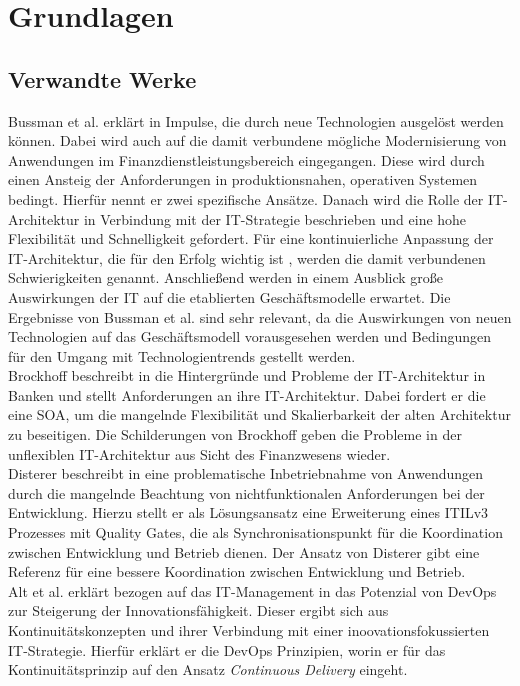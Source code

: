 \chapter{Grundlagen}

\section{Verwandte Werke}
Bussman et al. erklärt in \cite{Bussmann2006} Impulse, die durch neue Technologien ausgelöst werden können. Dabei wird auch auf die damit verbundene mögliche Modernisierung von Anwendungen im Finanzdienstleistungsbereich eingegangen. Diese wird durch einen Ansteig der Anforderungen in produktionsnahen, operativen Systemen \cite{Bussmann2006, Brockhoff2006} bedingt. Hierfür nennt er zwei spezifische Ansätze. Danach wird die Rolle der IT-Architektur in Verbindung mit der IT-Strategie beschrieben und eine hohe Flexibilität und Schnelligkeit gefordert. Für eine kontinuierliche Anpassung der IT-Architektur, die für den Erfolg wichtig ist \cite{Bussmann2006}, werden die damit verbundenen Schwierigkeiten genannt. Anschließend werden in einem Ausblick große Auswirkungen der IT auf die etablierten Geschäftsmodelle erwartet. Die Ergebnisse von Bussman et al. sind sehr relevant, da die Auswirkungen von neuen Technologien auf das Geschäftsmodell vorausgesehen werden und Bedingungen für den Umgang mit Technologientrends gestellt werden.
\medskip
\\
Brockhoff beschreibt in \cite{Brockhoff2006} die Hintergründe und Probleme der IT-Architektur in Banken und stellt Anforderungen an ihre IT-Architektur. Dabei fordert er die eine \ac{SOA}, um die mangelnde Flexibilität und Skalierbarkeit der alten Architektur zu beseitigen. Die Schilderungen von Brockhoff geben die Probleme in der unflexiblen IT-Architektur aus Sicht des Finanzwesens wieder.
\medskip
\\
Disterer beschreibt in \cite{mci/Disterer2011} eine problematische Inbetriebnahme von Anwendungen durch die mangelnde Beachtung von nichtfunktionalen Anforderungen bei der Entwicklung. Hierzu stellt er als Lösungsansatz eine Erweiterung eines ITILv3 Prozesses mit Quality Gates, die als Synchronisationspunkt für die Koordination zwischen Entwicklung und Betrieb dienen. Der Ansatz von Disterer gibt eine Referenz für eine bessere Koordination zwischen Entwicklung und Betrieb.
\medskip
\\
Alt et al. erklärt bezogen auf das IT-Management in \cite{Alt2017} das Potenzial von DevOps zur Steigerung der Innovationsfähigkeit. Dieser ergibt sich aus Kontinuitätskonzepten und ihrer Verbindung mit einer inoovationsfokussierten IT-Strategie. Hierfür erklärt er die DevOps Prinzipien, worin er für das Kontinuitätsprinzip auf den Ansatz \emph{Continuous Delivery} eingeht. 
